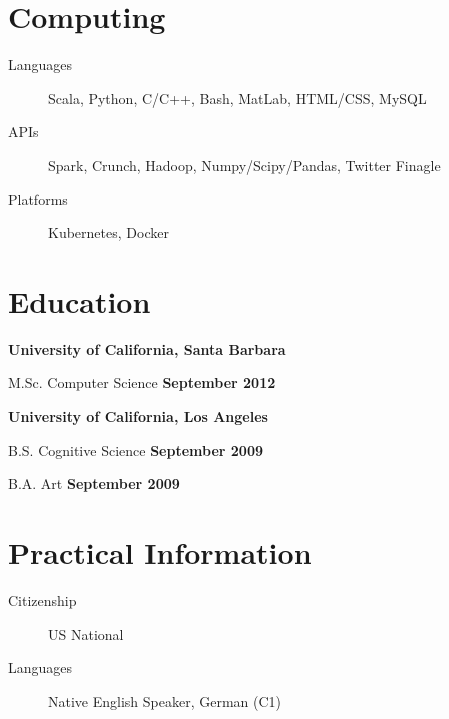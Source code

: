 \documentclass[margin,line]{res}
\newenvironment{list1}{
  \begin{list}{\ding{113}}{%
      \setlength{\itemsep}{0in}
      \setlength{\parsep}{0in} \setlength{\parskip}{0in}
      \setlength{\topsep}{0in} \setlength{\partopsep}{0in}
      \setlength{\leftmargin}{0.17in}}}{\end{list}}
\begin{document}
\begin{resume}
\section{\sc Computing}
\begin{description}
\item[Languages] Scala, Python, C/C++, Bash, MatLab, HTML/CSS, MySQL
\item[APIs] Spark, Crunch, Hadoop, Numpy/Scipy/Pandas, Twitter Finagle
\item[Platforms] Kubernetes, Docker
\end{description}

\section{\sc Education}
{\bf University of California, Santa Barbara}\\
\vspace*{-.1in}
\begin{list1}
\item[] M.Sc. Computer Science \hfill {\bf September 2012}
\end{list1}

{\bf University of California, Los Angeles}\\
\vspace*{-.1in}
\begin{list1}
\item[] B.S. Cognitive Science \hfill {\bf September 2009}
\item[] B.A. Art \hfill {\bf September 2009}
\end{list1}

\section{\sc Practical Information}
\begin{description}
\item[Citizenship] US National
\item[Languages] Native English Speaker, German (C1)
\end{description}





\end{resume}
\end{document}
